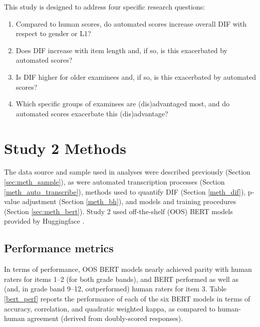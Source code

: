 \documentclass [PhD] {uclathes}
\begin{document}
This study is designed to address four specific research questions:

\begin{enumerate}
	\item Compared to human scores, do automated scores increase overall DIF with respect to gender or L1? 
	\item Does DIF increase with item length and, if so, is this exacerbated by automated scores?
	\item Is DIF higher for older examinees and, if so, is this exacerbated by automated scores?
	\item Which specific groups of examinees are (dis)advantaged most, and do automated scores exacerbate this (dis)advantage?
\end{enumerate}

\section{Study 2 Methods}

The data source and sample used in analyses were described previously (Section \ref{sec:meth_sample}), as were automated transcription processes (Section \ref{meth_auto_transcribe}), methods used to quantify DIF (Section \ref{meth_dif}), p-value adjustment (Section \ref{meth_bh}), and models and training procedures (Section \ref{sec:meth_bert}). Study 2 used off-the-shelf (OOS) BERT models provided by Huggingface \citep{wolf_transformers_2020}. 

\subsection{Performance metrics}

In terms of performance, OOS BERT models nearly achieved parity with human raters for items 1–2 (for both grade bands), and BERT performed as well as (and, in grade band 9–12, outperformed) human raters for item 3. Table \ref{bert_perf} reports the performance of each of the six BERT models in terms of accuracy, correlation, and quadratic weighted kappa, as compared to human-human agreement (derived from doubly-scored responses). 
\end{document}
